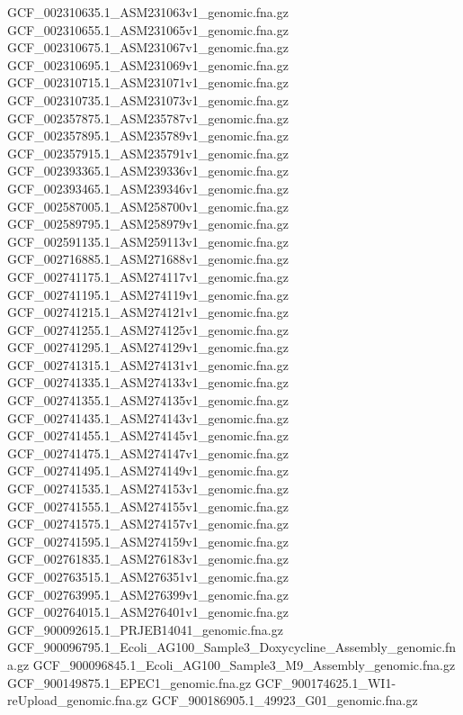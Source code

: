\documentclass[12pt, letterpaper]{article}
\begin{document}
\begin{verbatim*}
GCF_002310635.1_ASM231063v1_genomic.fna.gz
GCF_002310655.1_ASM231065v1_genomic.fna.gz
GCF_002310675.1_ASM231067v1_genomic.fna.gz
GCF_002310695.1_ASM231069v1_genomic.fna.gz
GCF_002310715.1_ASM231071v1_genomic.fna.gz
GCF_002310735.1_ASM231073v1_genomic.fna.gz
GCF_002357875.1_ASM235787v1_genomic.fna.gz
GCF_002357895.1_ASM235789v1_genomic.fna.gz
GCF_002357915.1_ASM235791v1_genomic.fna.gz
GCF_002393365.1_ASM239336v1_genomic.fna.gz
GCF_002393465.1_ASM239346v1_genomic.fna.gz
GCF_002587005.1_ASM258700v1_genomic.fna.gz
GCF_002589795.1_ASM258979v1_genomic.fna.gz
GCF_002591135.1_ASM259113v1_genomic.fna.gz
GCF_002716885.1_ASM271688v1_genomic.fna.gz
GCF_002741175.1_ASM274117v1_genomic.fna.gz
GCF_002741195.1_ASM274119v1_genomic.fna.gz
GCF_002741215.1_ASM274121v1_genomic.fna.gz
GCF_002741255.1_ASM274125v1_genomic.fna.gz
GCF_002741295.1_ASM274129v1_genomic.fna.gz
GCF_002741315.1_ASM274131v1_genomic.fna.gz
GCF_002741335.1_ASM274133v1_genomic.fna.gz
GCF_002741355.1_ASM274135v1_genomic.fna.gz
GCF_002741435.1_ASM274143v1_genomic.fna.gz
GCF_002741455.1_ASM274145v1_genomic.fna.gz
GCF_002741475.1_ASM274147v1_genomic.fna.gz
GCF_002741495.1_ASM274149v1_genomic.fna.gz
GCF_002741535.1_ASM274153v1_genomic.fna.gz
GCF_002741555.1_ASM274155v1_genomic.fna.gz
GCF_002741575.1_ASM274157v1_genomic.fna.gz
GCF_002741595.1_ASM274159v1_genomic.fna.gz
GCF_002761835.1_ASM276183v1_genomic.fna.gz
GCF_002763515.1_ASM276351v1_genomic.fna.gz
GCF_002763995.1_ASM276399v1_genomic.fna.gz
GCF_002764015.1_ASM276401v1_genomic.fna.gz
GCF_900092615.1_PRJEB14041_genomic.fna.gz
GCF_900096795.1_Ecoli_AG100_Sample3_Doxycycline_Assembly_genomic.fna.gz
GCF_900096845.1_Ecoli_AG100_Sample3_M9_Assembly_genomic.fna.gz
GCF_900149875.1_EPEC1_genomic.fna.gz
GCF_900174625.1_WI1-reUpload_genomic.fna.gz
GCF_900186905.1_49923_G01_genomic.fna.gz
\end{verbatim*}
\end{document}

